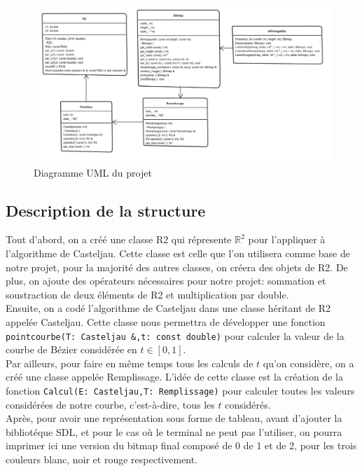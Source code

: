\documentclass[11pt,a4paper]{article}
\begin{document}
	\begin{figure}[ht]
		\centering
		\includegraphics[width=0.95\linewidth]{Images/uml.png}
		\caption{Diagramme UML du projet}
		\label{im:uml}
	\end{figure}
	
	\subsection{Description de la structure}
	Tout d'abord, on a créé une classe R2 qui répresente $\mathbb{R}^2$ pour l'appliquer à l'algorithme de Casteljau. Cette classe est celle que l'on utilisera comme base de notre projet, pour la majorité des autres classes, on créera des objets de R2. De plus, on ajoute des opérateurs nécessaires pour notre projet: sommation et soustraction de deux éléments de R2 et multiplication par double.\\
	
	Ensuite, on a codé l'algorithme de Casteljau dans une classe héritant de R2 appelée Casteljau. Cette classe nous permettra de développer une fonction \texttt{pointcourbe(T: Casteljau \&,t: const double)} pour calculer la valeur de la courbe de Bézier considérée en $t \in [0,1]$.\\
	
	Par ailleurs, pour faire en même temps tous les calculs de $t$ qu'on considère, on a créé une classe appelée Remplissage. L'idée de cette classe est la création de la fonction \texttt{Calcul(E: Casteljau,T: Remplissage)} pour calculer toutes les valeurs considérées de notre courbe, c'est-à-dire, tous les $t$ considérés.\\
	
	Après, pour avoir une représentation sous forme de tableau, avant d'ajouter la bibliotéque SDL, et pour le cas où le terminal ne peut pas l'utiliser, on pourra imprimer ici une version du bitmap final composé de 0 de 1 et de 2, pour les trois couleurs blanc, noir et rouge respectivement.\\
	
\end{document}
